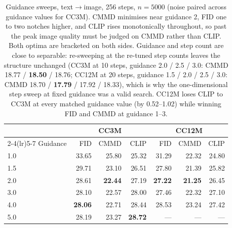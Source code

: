 \begin{table}[tb]
\centering
\footnotesize
\setlength{\tabcolsep}{4.5pt}
\begin{tabular}{l rrr @{\hspace{10pt}} rrr}
\toprule
& \multicolumn{3}{c}{\textbf{CC3M}} & \multicolumn{3}{c}{\textbf{CC12M}} \\
\cmidrule(lr){2-4}\cmidrule(lr){5-7}
Guidance & FID & CMMD & CLIP & FID & CMMD & CLIP \\
\midrule
1.0 & 33.65 & 25.80 & 25.32 & 31.29 & 22.32 & 24.80 \\
1.5 & 29.71 & 23.10 & 26.51 & 27.80 & 21.39 & 25.82 \\
2.0 & 28.61 & \textbf{22.44} & 27.19 & \textbf{27.22} & \textbf{21.25} & 26.45 \\
3.0 & 28.10 & 22.57 & 28.00 & 27.46 & 22.32 & 27.10 \\
4.0 & \textbf{28.06} & 22.71 & 28.44 & 28.53 & 23.24 & 27.42 \\
5.0 & 28.19 & 23.27 & \textbf{28.72} & --- & --- & --- \\
\bottomrule
\end{tabular}
\caption{Guidance sweeps, text$\rightarrow$image, 256 steps, $n{=}5000$ (noise paired across
guidance values for CC3M). CMMD minimises near guidance 2, FID one to two notches higher, and CLIP
rises monotonically throughout, so past the peak image quality must be judged on CMMD rather than
CLIP. Both optima are bracketed on both sides. Guidance and step count are close to separable:
re-sweeping at the re-tuned step counts leaves the structure unchanged (CC3M at 10 steps, guidance
2.0 / 2.5 / 3.0: CMMD 18.77 / \textbf{18.50} / 18.76; CC12M at 20 steps, guidance 1.5 / 2.0 / 2.5
/ 3.0: CMMD 18.70 / \textbf{17.79} / 17.92 / 18.33), which is why the one-dimensional step sweep
at fixed guidance was a valid search. CC12M loses CLIP to CC3M at every matched guidance value
(by 0.52--1.02) while winning FID and CMMD at guidance 1--3.}
\label{tab:app:image:guidance}
\end{table}

